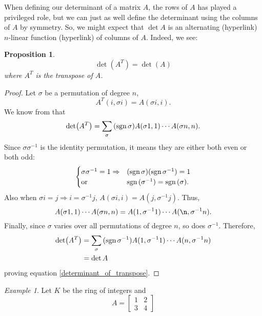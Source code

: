 \documentclass{book}
\newtheorem{prop}{Proposition}[section]
\theoremstyle{remark}
\newtheorem{example}{Example}[section]
\theoremstyle{definition}
\newcommand{\sgn}{\text{sgn\,}}
\newcommand{\inv}[1]{{#1}^{-1}}
\begin{document}
When defining our determinant of a matrix $A$, the rows of $A$ has played a privileged role, but we can just as well define the determinant using the columns of $A$ by symmetry. So, we might expect that $\det A$ is an alternating (hyperlink) $n$-linear function (hyperlink) of columns of $A$. Indeed, we see: 
\begin{prop}
\begin{equation}\label{determinant_of_transpose}
    \det (A^T) = \det(A)
\end{equation} 
where $A^T$ is the transpose of $A$.
\end{prop}
\begin{proof}
Let $\sigma$ be a permutation of degree $n$,
\begin{equation}
    A^T (i, \sigma i) = A (\sigma i, i).
\end{equation}
We know from \cite{} that 
\begin{equation}
    \det (A^T) = \sum_\sigma \, (\sgn \sigma) A(\sigma 1, 1) \cdots A(\sigma n, n).
\end{equation}
Since $\sigma \sigma ^{-1}$ is the identity permutation, it means they are either both even or both odd: 
\begin{equation}
    \begin{cases}
     \sigma \sigma^{-1} = 1 \Rightarrow &(\sgn \sigma)(\sgn \sigma^{-1}) = 1\\
    \text{or} & \sgn (\sigma ^{-1}) = \sgn (\sigma).
    \end{cases}
\end{equation}
Also when $\sigma i = j \Rightarrow i = \sigma^{-1}j$, $A(\sigma i, i) = A(j, \sigma^{-1}j)$. Thus,
\begin{equation}
    A(\sigma 1, 1) \cdots A(\sigma n, n) = A(1, \sigma^{-1}1) \cdots A(\n, \sigma^{-1} n). 
\end{equation}
Finally, since $\sigma$ varies over all permutations of degree $n$, so does $\sigma^{-1}$. Therefore, 
\begin{align}
    \det (A^T) &= \sum_\sigma \, (\sgn \inv{\sigma}) A(1, \inv{\sigma}1) \cdots A(n, \inv{\sigma}n)\\
    &= \det A
\end{align}
proving equation \ref{determinant_of_transpose}.
\end{proof}


\begin{example}
Let $K$ be the ring of integers and
\begin{equation*}
    A = 
    \begin{bmatrix}
        1 & 2\\
        3 & 4
    \end{bmatrix}
\end{equation*}

\end{example}
\end{document}

